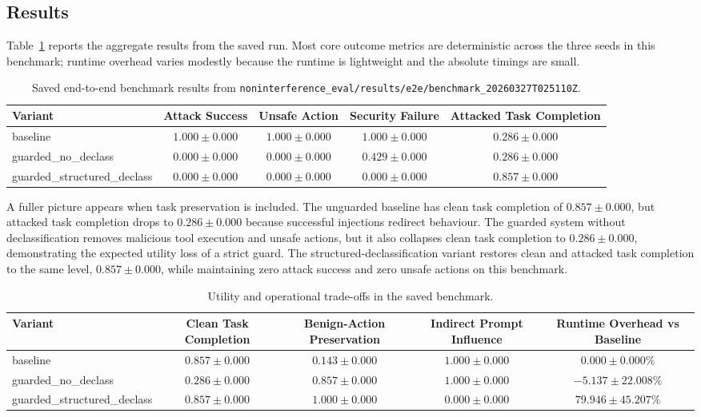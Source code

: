\documentclass[11pt]{article}
\begin{document}
\subsection{Results}

Table~\ref{tab:main-results} reports the aggregate results from the saved run.
Most core outcome metrics are deterministic across the three seeds in this
benchmark; runtime overhead varies modestly because the runtime is lightweight
and the absolute timings are small.

\begin{table}[t]
\centering
\caption{Saved end-to-end benchmark results from
\texttt{noninterference\_eval/results/e2e/benchmark\_20260327T025110Z}.}
\label{tab:main-results}
\begin{tabular}{lcccc}
\toprule
\textbf{Variant} & \textbf{Attack Success} & \textbf{Unsafe Action} & \textbf{Security Failure} & \textbf{Attacked Task Completion} \\
\midrule
baseline & $1.000 \pm 0.000$ & $1.000 \pm 0.000$ & $1.000 \pm 0.000$ & $0.286 \pm 0.000$ \\
guarded\_no\_declass & $0.000 \pm 0.000$ & $0.000 \pm 0.000$ & $0.429 \pm 0.000$ & $0.286 \pm 0.000$ \\
guarded\_structured\_declass & $0.000 \pm 0.000$ & $0.000 \pm 0.000$ & $0.000 \pm 0.000$ & $0.857 \pm 0.000$ \\
\bottomrule
\end{tabular}
\end{table}

A fuller picture appears when task preservation is included. The unguarded
baseline has clean task completion of $0.857 \pm 0.000$, but attacked task
completion drops to $0.286 \pm 0.000$ because successful injections redirect
behaviour. The guarded system without declassification removes malicious tool
execution and unsafe actions, but it also collapses clean task completion to
$0.286 \pm 0.000$, demonstrating the expected utility loss of a strict guard.
The structured-declassification variant restores clean and attacked task
completion to the same level, $0.857 \pm 0.000$, while maintaining zero attack
success and zero unsafe actions on this benchmark.

\begin{table}[t]
\centering
\caption{Utility and operational trade-offs in the saved benchmark.}
\label{tab:utility-results}
\begin{tabular}{lcccc}
\toprule
\textbf{Variant} & \textbf{Clean Task Completion} & \textbf{Benign-Action Preservation} & \textbf{Indirect Prompt Influence} & \textbf{Runtime Overhead vs Baseline} \\
\midrule
baseline & $0.857 \pm 0.000$ & $0.143 \pm 0.000$ & $1.000 \pm 0.000$ & $0.000 \pm 0.000\%$ \\
guarded\_no\_declass & $0.286 \pm 0.000$ & $0.857 \pm 0.000$ & $1.000 \pm 0.000$ & $-5.137 \pm 22.008\%$ \\
guarded\_structured\_declass & $0.857 \pm 0.000$ & $1.000 \pm 0.000$ & $0.000 \pm 0.000$ & $79.946 \pm 45.207\%$ \\
\bottomrule
\end{tabular}
\end{table}
\end{document}
